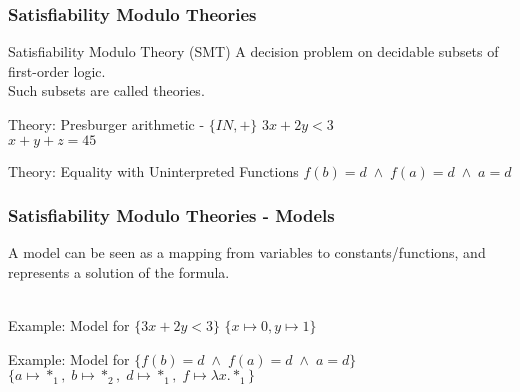 \documentclass{beamer}
\makeatletter
\newcommand{\hl}{\textcolor{fibeamer@darkColor1}}
\makeatother
\begin{document}
\begin{frame}
    \frametitle{Satisfiability Modulo Theories}

    \begin{block}{Satisfiability Modulo Theory (SMT)}
		A decision problem on \hl{decidable subsets} of first-order logic.\\
		Such subsets are called \hl{theories}.
    \end{block}

		\begin{exampleblock}{Theory: Presburger arithmetic - $\{I\!N, +\}$}
        $3x + 2y < 3$\\
        $x + y + z = 45$
    \end{exampleblock}

		\pause

		\begin{exampleblock}{Theory: Equality with Uninterpreted Functions}
        $f(b) = d \; \wedge \; f(a) = d \; \wedge \; a = d$
    \end{exampleblock}

\end{frame}

\begin{frame}
    \frametitle{Satisfiability Modulo Theories - Models}

    A model can be seen as a mapping from variables to constants/functions, and represents
		a solution of the formula.\\~\\

		\begin{exampleblock}{Example: Model for $\{3x + 2y < 3\}$}
				$\{ x \mapsto 0, y \mapsto 1\}$
		\end{exampleblock}

		\pause

		\begin{exampleblock}{Example: Model for $\{f(b) = d \; \wedge \; f(a) = d \; \wedge \; a = d\}$}
				$\{ a \mapsto *_1,\; b \mapsto *_2,\; d \mapsto *_1,\; f \mapsto \lambda x. *_1\}$
		\end{exampleblock}
\end{frame}
\end{document}
